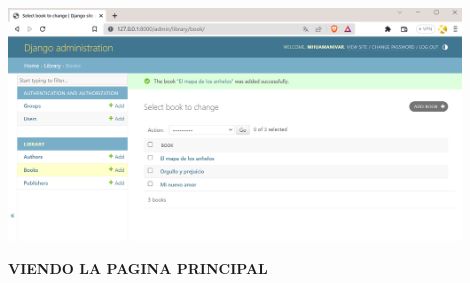 \documentclass{article}
\begin{document}
\begin{itemize}
\begin{minipage}{\linewidth}
    \centering
    \includegraphics[width=0.90\textwidth]{imagenes/img4.png}
\end{minipage}
\vspace{\baselineskip}

\end{itemize}



\vspace{2\baselineskip}

\textbf{VIENDO LA PAGINA PRINCIPAL}

\vspace{\baselineskip}
\end{document}
